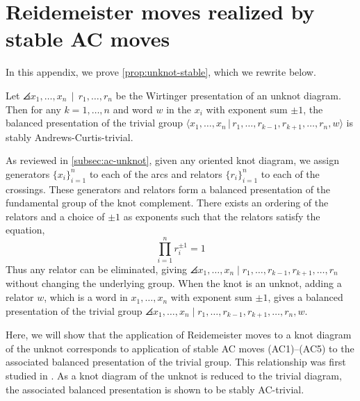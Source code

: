 \section{Reidemeister moves realized by stable AC moves}\label{app:reid}

In this appendix, we prove \autoref{prop:unknot-stable}, which we rewrite below.

\begin{proposition}
    Let $\angles{ x_1,\ldots, x_n\, \mid \, r_1, \ldots, r_n }$ be the Wirtinger presentation of an unknot diagram. Then for any $k=1,\ldots,n$ and word $w$ in the $x_i$ with exponent sum $\pm 1$, the balanced presentation of the trivial group $\langle x_1,\ldots, x_n\,|\, r_1,\ldots, r_{k-1}, r_{k+1},\ldots, r_n, w\rangle$ is stably Andrews-Curtis-trivial.
\end{proposition}

As reviewed in \autoref{subsec:ac-unknot}, given any oriented knot diagram, we assign generators $\{x_i\}_{i=1}^n$ to each of the arcs and relators $\{ r_i\}_{i=1}^n$ to each of the crossings. These generators and relators form a balanced presentation of the fundamental group of the knot complement. There exists an ordering of the relators and a choice of $\pm 1$ as exponents such that the relators satisfy the equation, 
\[
\prod\limits_{i=1}^n r_i^{\pm 1} = 1
\]
Thus any relator can be eliminated, giving $\angles{x_1, \dots , x_n \mid r_1, \dots, r_{k-1}, r_{k+1}, \dots, r_n }$ without changing the underlying group. When the knot is an unknot, adding a relator $w$, which is a word in $x_1, \dots , x_n$ with exponent sum $\pm 1$, gives a balanced presentation of the trivial group $\angles{x_1, \dots , x_n \mid r_1, \dots, r_{k-1}, r_{k+1}, \dots, r_n , w}$. 

Here, we will show that the application of Reidemeister moves to a knot diagram of the unknot corresponds to application of stable AC moves (AC1)--(AC5) to the associated balanced presentation of the trivial group. This relationship was first studied in \cite{WADA1994241}.
As a knot diagram of the unknot is reduced to the trivial diagram, the associated balanced presentation is shown to be stably AC-trivial.

